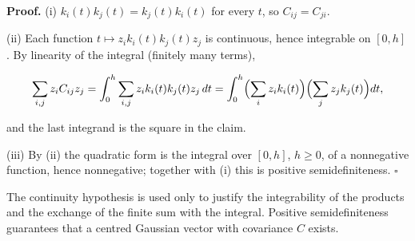 \documentclass[11pt,a4paper]{article}
\begin{document}
\textbf{Proof.} (i) \(k_i(t)k_j(t)=k_j(t)k_i(t)\) for every \(t\), so \(C_{ij}=C_{ji}\).




(ii) Each function \(t\mapsto z_ik_i(t)k_j(t)z_j\) is continuous, hence integrable on \([0,h]\). By linearity of the integral (finitely many terms),


\[\sum_{i,j}z_iC_{ij}z_j=\int_0^h\sum_{i,j}z_ik_i(t)k_j(t)z_j\,dt=\int_0^h\Bigl(\sum_iz_ik_i(t)\Bigr)\Bigl(\sum_jz_jk_j(t)\Bigr)dt,\]


and the last integrand is the square in the claim.




(iii) By (ii) the quadratic form is the integral over \([0,h]\), \(h\ge0\), of a nonnegative function, hence nonnegative; together with (i) this is positive semidefiniteness. \(\square\)




The continuity hypothesis is used only to justify the integrability of the products and the exchange of the finite sum with the integral. Positive semidefiniteness guarantees that a centred Gaussian vector with covariance \(C\) exists.
\end{document}
